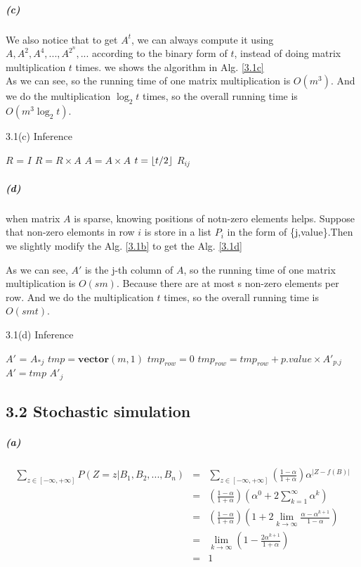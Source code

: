 \documentclass{article}
\DeclarePairedDelimiter\floor{\lfloor}{\rfloor}
\begin{document}
\subparagraph*{(c)}
We also notice that to get $A^t$, we can always compute it using $A,A^2,A^4,...,A^{2^n},...$ according to the binary form of $t$, instead of doing matrix multiplication $t$ times. we shows the algorithm in Alg. \ref{3.1c}\\

As we can see, so the running time of one matrix multiplication is $O(m^3)$. And we do the multiplication $\log_2t$ times, so the overall running time is $O(m^3\log_2t)$. 

\begin{algorithm}[h]
	\caption{3.1(c) Inference}\label{3.1c}
	\begin{algorithmic}[1]
		\State $R$ = $I$
		\State $R = R \times A$
		\EndIf
		\State $A = A \times A$
		\State $t = \floor*{t/2}$
		\EndWhile
		\State \Return $R_{ij}$
		\EndFunction
	\end{algorithmic}
\end{algorithm}

\subparagraph*{(d)}
when matrix $A$ is sparse, knowing positions of notn-zero elements helps. Suppose that non-zero elemonts in row $i$ is store in a list $P_i$ in the form of \{j,value\}.Then we slightly modify the Alg. \ref{3.1b} to get the Alg. \ref{3.1d}

As we can see, $A'$ is the j-th column of $A$, so the running time of one matrix multiplication is $O(sm)$. Because there are at most s non-zero elements per row. And we do the multiplication $t$ times, so the overall running time is $O(smt)$.  
\begin{algorithm}[h]
	\caption{3.1(d) Inference}\label{3.1d}
	\begin{algorithmic}[1]
		\State $A'$ = $A_{*j}$
		\State $tmp = \mathbf{vector}(m,1)$
		\State $ tmp_{row} = 0$
		\State $ tmp_{row} = tmp_{row} + p.value \times A'_{p.j}$
		\EndFor
		\EndFor
		\State $A' = tmp$
		\EndFor
		\State \Return $A'_j$
		\EndFunction
	\end{algorithmic}
\end{algorithm}

\subsection*{3.2 Stochastic simulation}
\subparagraph*{(a)}
\begin{eqnarray*}
\sum_{z \in [-\infty, +\infty]}P(Z=z | B_1,B_2,...,B_n) &=& \sum_{z \in [-\infty, +\infty]}(\frac{1-\alpha}{1+\alpha})\alpha^{|Z-f(B)|}\\
&=&(\frac{1-\alpha}{1+\alpha})(\alpha^0+2\sum_{k=1}^{\infty}\alpha^k)\\
&=&(\frac{1-\alpha}{1+\alpha})(1+2\lim_{k \to \infty}\frac{\alpha-\alpha^{k+1}}{1-\alpha})\\
&=&\lim_{k \to \infty}(1-\frac{2\alpha^{k+1}}{1+\alpha})\\
&=&1
\end{eqnarray*}
\end{document}

